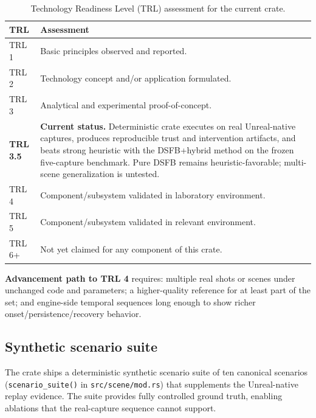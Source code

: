 \documentclass[11pt]{article}
\theoremstyle{definition}
\theoremstyle{plain}
\begin{document}
\begin{table}[H]
\centering
\caption{Technology Readiness Level (TRL) assessment for the current crate.}
\label{tab:trl}
\small
\begin{tabular}{p{1.5cm} p{10cm}}
\toprule
TRL & Assessment \\
\midrule
TRL 1 & Basic principles observed and reported. \\
TRL 2 & Technology concept and/or application formulated. \\
TRL 3 & Analytical and experimental proof-of-concept. \\
\textbf{TRL 3.5} & \textbf{Current status.} Deterministic crate executes on real Unreal-native captures, produces reproducible trust and intervention artifacts, and beats strong heuristic with the DSFB+hybrid method on the frozen five-capture benchmark. Pure DSFB remains heuristic-favorable; multi-scene generalization is untested. \\
TRL 4 & Component/subsystem validated in laboratory environment. \\
TRL 5 & Component/subsystem validated in relevant environment. \\
TRL 6+ & Not yet claimed for any component of this crate. \\
\bottomrule
\end{tabular}
\end{table}

\noindent\textbf{Advancement path to TRL 4} requires: multiple real shots or scenes under unchanged code and parameters; a higher-quality reference for at least part of the set; and engine-side temporal sequences long enough to show richer onset/persistence/recovery behavior.

\subsection{Synthetic scenario suite}
\label{sec:scenario-suite}

The crate ships a deterministic synthetic scenario suite of ten canonical scenarios (\texttt{scenario\_suite()} in \texttt{src/scene/mod.rs}) that supplements the Unreal-native replay evidence. The suite provides fully controlled ground truth, enabling ablations that the real-capture sequence cannot support.
\end{document}
